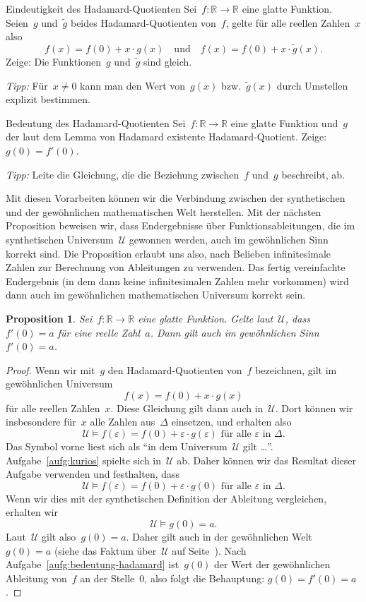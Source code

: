 \documentclass[twoside]{../zirkelblatt}
\newcommand{\RR}{\mathbb{R}}
\newcommand{\U}{\mathcal{U}}
\theoremstyle{definition}
\theoremstyle{plain}
\newtheorem{prop}[defn]{Proposition}
\theoremstyle{remark}
\begin{document}
\begin{aufgabeShaded}{Eindeutigkeit des Hadamard-Quotienten}
Sei~$f : \RR \to \RR$ eine glatte Funktion. Seien~$g$ und~$\widetilde g$ beides
Hadamard-Quotienten von~$f$, gelte für alle reellen Zahlen~$x$ also
\[ f(x) = f(0) + x \cdot g(x) \quad\text{und}\quad f(x) = f(0) + x \cdot \widetilde g(x). \]
Zeige: Die Funktionen~$g$ und~$\widetilde g$ sind gleich.

\emph{Tipp:} Für~$x \neq 0$ kann man den Wert von~$g(x)$ bzw.~$\widetilde g(x)$
durch Umstellen explizit bestimmen.
\end{aufgabeShaded}

\begin{aufgabeShaded}{Bedeutung des Hadamard-Quotienten}
\label{aufg:bedeutung-hadamard}
Sei~$f : \RR \to \RR$ eine glatte Funktion und~$g$ der laut dem
Lemma von Hadamard existente Hadamard-Quotient. Zeige: $g(0) = f'(0)$.

\emph{Tipp:} Leite die Gleichung, die die Beziehung zwischen~$f$
und~$g$ beschreibt, ab.
\end{aufgabeShaded}

Mit diesen Vorarbeiten können wir die Verbindung zwischen der synthetischen und
der gewöhnlichen mathematischen Welt herstellen. Mit der nächsten Proposition
beweisen wir, dass Endergebnisse über Funktionsableitungen, die im
synthetischen Universum~$\U$ gewonnen werden, auch im gewöhnlichen Sinn korrekt
sind. Die Proposition erlaubt uns also, nach Belieben infinitesimale Zahlen zur
Berechnung von Ableitungen zu verwenden. Das fertig vereinfachte Endergebnis
(in dem dann keine infinitesimalen Zahlen mehr vorkommen) wird dann auch im
gewöhnlichen mathematischen Universum korrekt sein.

\begin{prop}\label{prop:ableitung-sdg-gew}
Sei~$f : \RR \to \RR$ eine glatte Funktion. Gelte laut~$\U$,
dass~$f'(0) = a$ für eine reelle Zahl~$a$. Dann gilt auch im gewöhnlichen
Sinn~$f'(0) = a$.
\end{prop}
\begin{proof}Wenn wir mit~$g$ den Hadamard-Quotienten von~$f$ bezeichnen, gilt
im gewöhnlichen Universum
\[ f(x) = f(0) + x \cdot g(x) \]
für alle reellen Zahlen~$x$. Diese Gleichung gilt dann auch in~$\U$. Dort
können wir insbesondere für~$x$ alle Zahlen aus~$\Delta$ einsetzen, und
erhalten also
\[ \U \models \text{$f(\varepsilon) = f(0) + \varepsilon \cdot g(\varepsilon)$ für
alle~$\varepsilon$ in~$\Delta$.} \]
Das Symbol vorne liest sich als "`in dem Universum~$\U$ gilt \ldots"'.
Aufgabe~\ref{aufg:kurios} spielte sich in~$\U$ ab. Daher können wir das
Resultat dieser Aufgabe verwenden und festhalten, dass
\[ \U \models \text{$f(\varepsilon) = f(0) + \varepsilon \cdot g(0)$ für
alle~$\varepsilon$ in~$\Delta$.} \]
Wenn wir dies mit der synthetischen Definition der Ableitung vergleichen,
erhalten wir
\[ \U \models g(0) = a. \]
Laut~$\U$ gilt also~$g(0) = a$. Daher gilt auch in der gewöhnlichen Welt~$g(0)
= a$ (siehe das Faktum über~$\U$ auf Seite~\pageref{fact:sdg-universum}). Nach
Aufgabe~\ref{aufg:bedeutung-hadamard} ist~$g(0)$ der Wert der gewöhnlichen
Ableitung von~$f$ an der Stelle~$0$, also folgt die Behauptung: $g(0) = f'(0) =
a$.
\end{proof}
\end{document}
